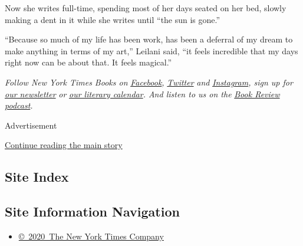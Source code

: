 Now she writes full-time, spending most of her days seated on her bed,
slowly making a dent in it while she writes until ``the sun is gone.''

``Because so much of my life has been work, has been a deferral of my
dream to make anything in terms of my art,'' Leilani said, ``it feels
incredible that my days right now can be about that. It feels magical.''

\emph{Follow New York Times Books on}
\href{https://www.facebook.com/nytbooks/}{\emph{Facebook}}\emph{,}
\href{https://twitter.com/nytimesbooks}{\emph{Twitter}} \emph{and}
\href{https://www.instagram.com/nytbooks/}{\emph{Instagram}}\emph{, sign
up for}
\href{https://www.nytimes.com/newsletters/books-review}{\emph{our
newsletter}} \emph{or}
\href{https://www.nytimes.com/interactive/2017/books/books-calendar.html}{\emph{our
literary calendar}}\emph{. And listen to us on the}
\href{https://www.nytimes.com/column/book-review-podcast}{\emph{Book
Review podcast}}\emph{.}

Advertisement

\protect\hyperlink{after-bottom}{Continue reading the main story}

\hypertarget{site-index}{%
\subsection{Site Index}\label{site-index}}

\hypertarget{site-information-navigation}{%
\subsection{Site Information
Navigation}\label{site-information-navigation}}

\begin{itemize}
\tightlist
\item
  \href{https://help.nytimes.com/hc/en-us/articles/115014792127-Copyright-notice}{©~2020~The
  New York Times Company}
\end{itemize}

